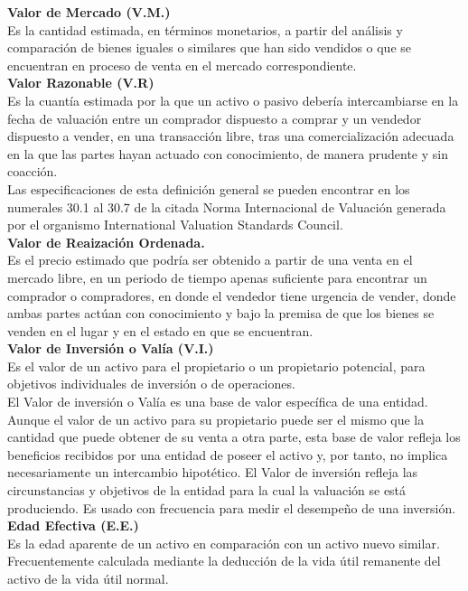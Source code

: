 \textbf{Valor de Mercado (V.M.)} \\ 
Es la cantidad estimada, en términos monetarios, a partir del análisis y comparación de bienes iguales o similares que han sido vendidos o que se encuentran en proceso de venta en el mercado correspondiente. \\[6mm]
\textbf{Valor Razonable (V.R)} \\ 
Es la cuantía estimada por la que un activo o pasivo debería intercambiarse en la fecha de valuación entre un comprador dispuesto a comprar y un vendedor dispuesto a vender, en una transacción libre, tras una comercialización adecuada en la que las partes hayan actuado con conocimiento, de manera prudente y sin coacción. \\ 
Las especificaciones de esta definición general se pueden encontrar en los numerales 30.1 al 30.7 de la citada Norma Internacional de Valuación generada por el organismo International Valuation Standards Council. \\[6mm] 
\textbf{Valor de Reaización Ordenada.} \\ 
Es el precio estimado que podría ser obtenido a partir de una venta en el mercado libre, 
en un periodo de tiempo apenas suficiente para encontrar un comprador o compradores, 
en donde el vendedor tiene urgencia de vender, donde ambas partes actúan con 
conocimiento y bajo la premisa de que los bienes se venden en el lugar y en el
estado en que se encuentran. \\[6mm]
\textbf{Valor de Inversión o Valía (V.I.)} \\ 
Es el valor de un activo para el propietario o un propietario potencial, para objetivos individuales de inversión o de operaciones. \\[2mm]
El Valor de inversión o Valía es una base de valor específica de una entidad. 
Aunque el valor de un activo para su propietario puede ser el mismo que la cantidad que puede obtener de su venta a otra parte, esta base de valor refleja los beneficios recibidos por una entidad de poseer el activo y, por tanto, no implica necesariamente un intercambio hipotético. 
El Valor de inversión refleja las circunstancias y objetivos de la entidad para la cual la valuación se está produciendo. 
Es usado con frecuencia para medir el desempeño de una inversión. \\[6mm] 
\textbf{Edad Efectiva (E.E.)} \\ 
Es la edad aparente de un activo en comparación con un activo nuevo similar. Frecuentemente calculada mediante la deducción de la vida útil remanente del activo de la vida útil normal. \\[6mm]
